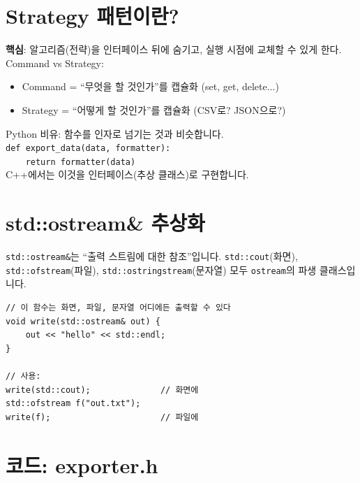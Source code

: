 \documentclass[11pt,a4paper]{book}
\newcommand{\code}[1]{\texttt{#1}}
\begin{document}
\section{Strategy 패턴이란?}

\begin{conceptbox}[title={Strategy 패턴}]
\textbf{핵심}: 알고리즘(전략)을 인터페이스 뒤에 숨기고, 실행 시점에 교체할 수 있게 한다.\\[6pt]
Command vs Strategy:
\begin{itemize}[nosep]
\item Command = ``무엇을 할 것인가''를 캡슐화 (set, get, delete...)
\item Strategy = ``어떻게 할 것인가''를 캡슐화 (CSV로? JSON으로?)
\end{itemize}
\end{conceptbox}

\begin{pythonbox}
Python 비유: 함수를 인자로 넘기는 것과 비슷합니다.\\
\code{def export\_data(data, formatter):}\\
\code{~~~~return formatter(data)}\\[6pt]
C++에서는 이것을 인터페이스(추상 클래스)로 구현합니다.
\end{pythonbox}

\section{std::ostream\& 추상화}

\code{std::ostream\&}는 ``출력 스트림에 대한 참조''입니다. \code{std::cout}(화면), \code{std::ofstream}(파일), \code{std::ostringstream}(문자열) 모두 \code{ostream}의 파생 클래스입니다.

\begin{lstlisting}[style=cpp]
// 이 함수는 화면, 파일, 문자열 어디에든 출력할 수 있다
void write(std::ostream& out) {
    out << "hello" << std::endl;
}

// 사용:
write(std::cout);              // 화면에
std::ofstream f("out.txt");
write(f);                      // 파일에
\end{lstlisting}

\section{코드: exporter.h}
\end{document}
